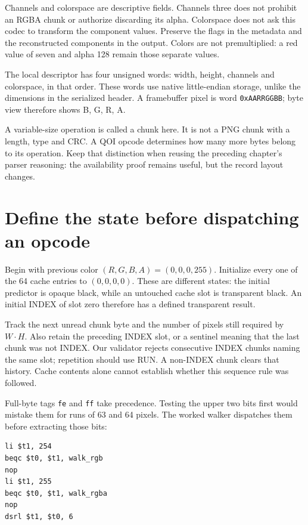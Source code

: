 Channels and colorspace are descriptive fields. Channels three does not prohibit
an RGBA chunk or authorize discarding its alpha. Colorspace does not ask this
codec to transform the component values. Preserve the flags in the metadata
and the reconstructed components in the output. Colors are not premultiplied:
a red value of seven and alpha 128 remain those separate values.

The local descriptor has four unsigned words: width, height, channels and
colorspace, in that order. These words use native little-endian storage, unlike
the dimensions in the serialized header. A framebuffer pixel is word
\texttt{0xAARRGGBB}; byte view therefore shows B, G, R, A.



A variable-size operation is called a chunk here. It is not a PNG chunk with a
length, type and CRC. A QOI opcode determines how many more bytes belong to its
operation. Keep that distinction when reusing the preceding chapter's parser
reasoning: the availability proof remains useful, but the record layout changes.

\section{Define the state before dispatching an opcode}

Begin with previous color $(R,G,B,A)=(0,0,0,255)$. Initialize every one of the
64 cache entries to $(0,0,0,0)$. These are different states: the initial predictor
is opaque black, while an untouched cache slot is transparent black. An initial
INDEX of slot zero therefore has a defined transparent result.

Track the next unread chunk byte and the number of pixels still required by
$W\cdot H$. Also retain the preceding INDEX slot, or a sentinel meaning that the
last chunk was not INDEX. Our validator rejects consecutive INDEX chunks naming
the same slot; repetition should use RUN. A non-INDEX chunk clears that history.
Cache contents alone cannot establish whether this sequence rule was followed.



Full-byte tags \texttt{fe} and \texttt{ff} take precedence. Testing the upper
two bits first would mistake them for runs of 63 and 64 pixels. The worked
walker dispatches them before extracting those bits:
\begin{verbatim}
li $t1, 254
beqc $t0, $t1, walk_rgb
nop
li $t1, 255
beqc $t0, $t1, walk_rgba
nop
dsrl $t1, $t0, 6
\end{verbatim}


